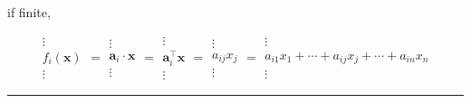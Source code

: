 \documentclass[
]{book}
\theoremstyle{definition}
\theoremstyle{definition}
\theoremstyle{definition}
\theoremstyle{definition}
\theoremstyle{remark}
\begin{document}
if finite,

\[
\begin{array}{c}
\vdots\\
f_{{\scriptscriptstyle i}}\left(\boldsymbol{x}\right)\\
\vdots
\end{array}=\begin{array}{c}
\vdots\\
\boldsymbol{a}_{{\scriptscriptstyle i}}\cdot\boldsymbol{x}\\
\vdots
\end{array}=\begin{array}{c}
\vdots\\
\boldsymbol{a}_{{\scriptscriptstyle i}}^{\intercal}\boldsymbol{x}\\
\vdots
\end{array}=\begin{array}{c}
\vdots\\
a_{{\scriptscriptstyle ij}}x_{{\scriptscriptstyle j}}\\
\vdots
\end{array}=\begin{array}{c}
\vdots\\
a_{{\scriptscriptstyle i1}}x_{{\scriptscriptstyle 1}}+\cdots+a_{{\scriptscriptstyle ij}}x_{{\scriptscriptstyle j}}+\cdots+a_{{\scriptscriptstyle in}}x_{{\scriptscriptstyle n}}\\
\vdots
\end{array}
\]

\begin{center}\rule{0.5\linewidth}{0.5pt}\end{center}
\end{document}
